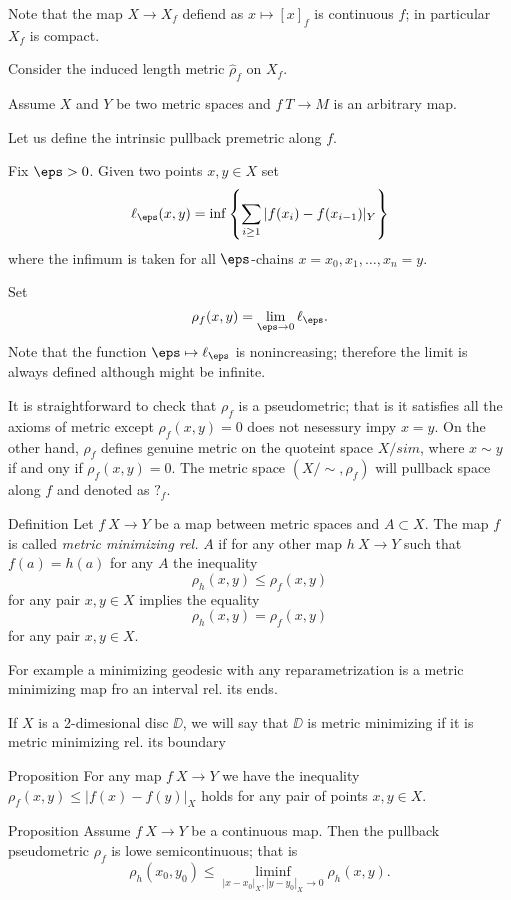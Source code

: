 Note that the map $X\to X_f$ defiend as $x\mapsto [x]_f$
is continuous $f$;
in particular $X_f$ is compact.

Consider the induced length metric $\hat\rho_f$ on $X_f$.


Assume $X$ and $Y$ be two metric spaces 
and $f\:T\to M$ is an arbitrary map.

Let us define the intrinsic pullback premetric along $f$.

Fix $\eps>0$.
Given two points $x,y\in X$
set 
\[\ell_\eps(x,y)=\inf\left\{\sum_{i\ge 1}|f(x_i)-f(x_{i-1})|_Y\right\}\]
where the infimum is taken for all $\eps$-chains
$x=x_0,x_1,\dots,x_n=y$.

Set
\[\rho_f(x,y)=\lim_{\eps\to0}\ell_\eps.\]
Note that the function $\eps\mapsto\ell_\eps$ is nonincreasing;
therefore the limit is always defined although might be infinite.

It is straightforward to check that $\rho_f$ is a pseudometric;
that is it satisfies all the axioms of metric except $\rho_f(x,y)=0$ does not nesessury impy $x=y$.
On the other hand, $\rho_f$
defines genuine metric on the quoteint space $X/sim$,
where $x\sim y$ if and ony if $\rho_f(x,y)=0$.
The metric space $(X/\sim,\rho_f)$ will pullback space along $f$
and denoted as $?_f$.

\begin{thm}{Definition}
Let $f\:X\to Y$ be a map between metric spaces
and $A\subset X$.
The map $f$ is called \emph{metric minimizing rel.} $A$
if for any other map $h\: X\to Y$ 
such that $f(a)=h(a)$ for any $A$
the inequality
\[\rho_{h}(x,y)\le \rho_f(x,y)\]
for any pair $x,y\in X$
implies the equality
\[\rho_{h}(x,y)= \rho_f(x,y)\]
for any pair $x,y\in X$.
\end{thm}

For example a minimizing geodesic with any reparametrization is a metric minimizing map fro an interval rel. its ends.

If $X$ is a 2-dimesional disc $\DD$,
we will say that $\DD$ is metric minimizing if it is metric minimizing rel. its boundary

\begin{thm}{Proposition}
For any map $f\:X\to Y$ we have the inequality 
$\rho_f(x,y)\le |f(x)-f(y)|_X$
holds for any pair of points $x,y\in X$.
\end{thm}


\begin{thm}{Proposition}
Assume $f\:X\to Y$ be a continuous map.
Then the pullback pseudometric $\rho_f$ is lowe semicontinuous;
that is
\[\rho_h(x_0,y_0)
\le
\liminf_{|x-x_0|_X,|y-y_0|_X\to 0}
\rho_h(x,y).\]
\end{thm}